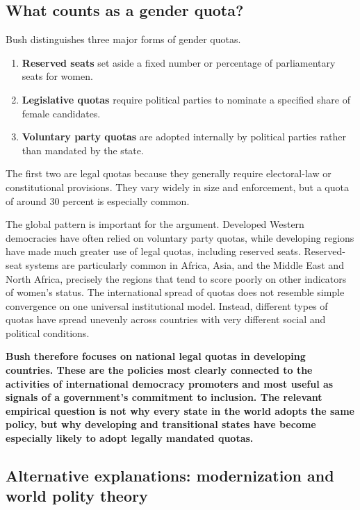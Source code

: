 \subsection{What counts as a gender quota?}

Bush distinguishes three major forms of gender quotas.

\begin{enumerate}
    \item \textbf{Reserved seats} set aside a fixed number or percentage of parliamentary seats for women.
    \item \textbf{Legislative quotas} require political parties to nominate a specified share of female candidates.
    \item \textbf{Voluntary party quotas} are adopted internally by political parties rather than mandated by the state.
\end{enumerate}

The first two are legal quotas because they generally require electoral-law or constitutional provisions. They vary widely in size and enforcement, but a quota of around 30 percent is especially common.

The global pattern is important for the argument. Developed Western democracies have often relied on voluntary party quotas, while developing regions have made much greater use of legal quotas, including reserved seats. Reserved-seat systems are particularly common in Africa, Asia, and the Middle East and North Africa, precisely the regions that tend to score poorly on other indicators of women's status. The international spread of quotas does not resemble simple convergence on one universal institutional model. Instead, different types of quotas have spread unevenly across countries with very different social and political conditions.

\textbf{Bush therefore focuses on national legal quotas in developing countries. These are the policies most clearly connected to the activities of international democracy promoters and most useful as signals of a government's commitment to inclusion. The relevant empirical question is not why every state in the world adopts the same policy, but why developing and transitional states have become especially likely to adopt legally mandated quotas.}

\subsection{Alternative explanations: modernization and world polity theory}

